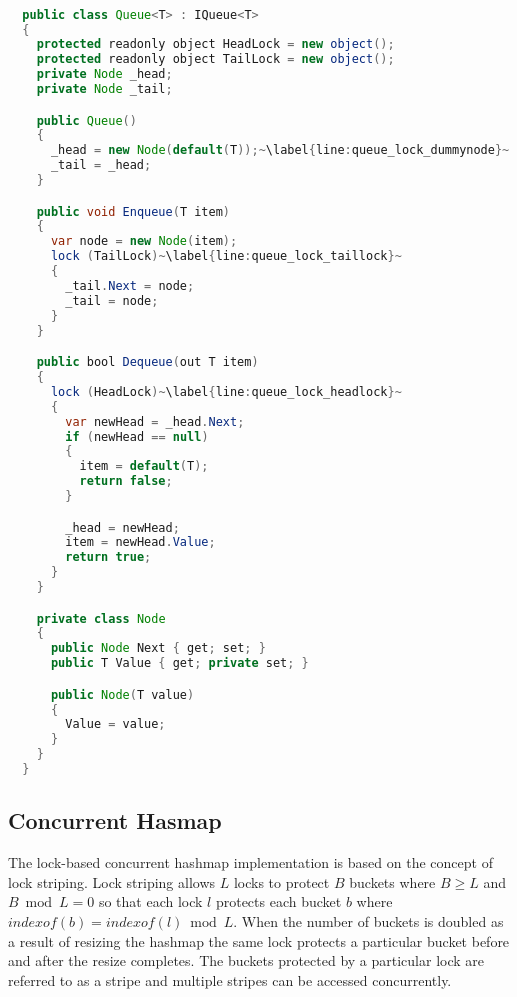 \begin{lstlisting}[label=lst:impl_queue_lock,
  caption={Lock based Concurrent Queue Implementation},
  language=Java,  
  showspaces=false,
  showtabs=false,
  breaklines=true,
  showstringspaces=false,
  breakatwhitespace=true,
  commentstyle=\color{greencomments},
  keywordstyle=\color{bluekeywords},
  stringstyle=\color{redstrings},
  escapechar=~,
  morekeywords={atomic, retry, orelse, var, get, set, ref, out, readonly, virtual, override, lock}]  % Start your code-block

  public class Queue<T> : IQueue<T>
  {
    protected readonly object HeadLock = new object();
    protected readonly object TailLock = new object();
    private Node _head;
    private Node _tail;

    public Queue()
    {
      _head = new Node(default(T));~\label{line:queue_lock_dummynode}~
      _tail = _head;
    }

    public void Enqueue(T item)
    {
      var node = new Node(item);
      lock (TailLock)~\label{line:queue_lock_taillock}~
      {
        _tail.Next = node;
        _tail = node;
      }
    }

    public bool Dequeue(out T item)
    {
      lock (HeadLock)~\label{line:queue_lock_headlock}~
      {
        var newHead = _head.Next;
        if (newHead == null)
        {
          item = default(T);
          return false;
        }

        _head = newHead;
        item = newHead.Value;
        return true;
      }
    }

    private class Node
    {
      public Node Next { get; set; }
      public T Value { get; private set; }

      public Node(T value)
      {
        Value = value;
      }
    }
  }

\end{lstlisting}

\subsection{Concurrent Hasmap}
The lock-based concurrent hashmap implementation is based on the concept of lock striping. Lock striping allows $L$ locks to protect $B$ buckets where $B \geq L$ and $B \bmod L = 0$ so that each lock $l$ protects each bucket $b$ where $indexof(b) = indexof(l) \bmod L$\cite[p. 304]{herlihy2012art}. When the number of buckets is doubled as a result of resizing the hashmap the same lock protects a particular bucket before and after the resize completes. The buckets protected by a particular lock are referred to as a stripe and multiple stripes can be accessed concurrently.

